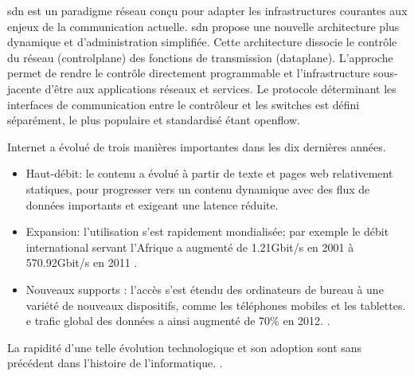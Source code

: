 \gls{sdn} est un \gls{paradigme} réseau conçu pour adapter les infrastructures courantes aux enjeux de la communication actuelle.
\gls{sdn} propose une nouvelle architecture plus dynamique et d'administration simplifiée. Cette architecture dissocie le contrôle du réseau (\gls{controlplane}) des fonctions de transmission (\gls{dataplane}). L'approche permet de rendre le contrôle directement programmable et l'infrastructure sous-jacente d'être  aux applications réseaux et services. Le protocole déterminant les interfaces de communication entre le contrôleur et les switches est défini séparément, le plus populaire et standardisé étant \gls{openflow}. \cite{OpenFlowStanford} \cite{ODCAintro} \cite{SDNNewNormONFExecutiveSummary}

\vspace*{1\baselineskip}




Internet a évolué de trois manières importantes dans les dix dernières années. %
\begin{itemize}
\itemsep0.5em 
\item Haut-débit: le contenu a évolué à partir de texte et pages web relativement statiques, pour progresser vers un contenu dynamique avec des flux de données importants et exigeant  une latence réduite. 
\item Expansion: l'utilisation s'est rapidement mondialisée; par exemple le débit international servant l'Afrique a augmenté de 1.21Gbit/s en 2001 à 570.92Gbit/s en 2011 \cite{InternetGlobalGrowthImpactDevelopingCountries}. 
\item  Nouveaux supports : l'accès s'est étendu des ordinateurs de bureau à une variété de nouveaux dispositifs, comme les téléphones mobiles et les tablettes. e trafic global des données a ainsi augmenté de 70\% en 2012. \cite{CiscoVNI2013}. \\
\end{itemize}

\par
La rapidité d'une telle évolution technologique et son adoption sont sans précédent dans l'histoire de l'informatique. \cite{InternetGlobalGrowthImpactDevelopingCountries}.


